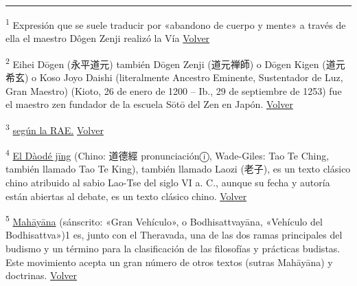 \documentclass[
  a5paperpaper,
]{article}
\begin{document}
\hfill\break

\begin{center}\rule{0.5\linewidth}{0.5pt}\end{center}

\leavevmode{}%
\textsuperscript{1} Expresión que se suele traducir por «abandono de
cuerpo y mente» a través de ella el maestro Dôgen Zenji realizó la Vía
\protect\hyperlink{ref1}{Volver}

\textsuperscript{2} Eihei Dōgen (永平道元) también Dōgen Zenji
(道元禅師) o Dōgen Kigen (道元希玄) o Koso Joyo Daishi (literalmente
Ancestro Eminente, Sustentador de Luz, Gran Maestro) (Kioto, 26 de enero
de 1200 -- Ib., 29 de septiembre de 1253) fue el maestro zen fundador de
la escuela Sōtō del Zen en Japón. \protect\hyperlink{ref2}{Volver}

\textsuperscript{3} \href{https://dle.rae.es/abismo?m=form}{según la
RAE.} \protect\hyperlink{ref3}{Volver}

\textsuperscript{4}
\href{https://es.wikipedia.org/wiki/D\%C3\%A0od\%C3\%A9_j\%C4\%ABng}{El
Dàodé jīng} (Chino: 道德經 pronunciaciónⓘ, Wade-Giles: Tao Te Ching,
también llamado Tao Te King), también llamado Laozi (老子), es un texto
clásico chino atribuido al sabio Lao-Tse del siglo VI a. C., aunque su
fecha y autoría están abiertas al debate, es un texto clásico chino.
\protect\hyperlink{ref4}{Volver}

\textsuperscript{5}
\href{https://es.wikipedia.org/wiki/Mah\%C4\%81y\%C4\%81na}{Mahāyāna}
(sánscrito: «Gran Vehículo», o Bodhisattvayāna, «Vehículo del
Bodhisattva»)1\hspace{0pt} es, junto con el Theravada, una de las dos
ramas principales del budismo y un término para la clasificación de las
filosofías y prácticas budistas. Este movimiento acepta un gran número
de otros textos (sutras Mahāyāna) y doctrinas.
\protect\hyperlink{ref5}{Volver}

\hfill\break

\hfill\break
\end{document}
